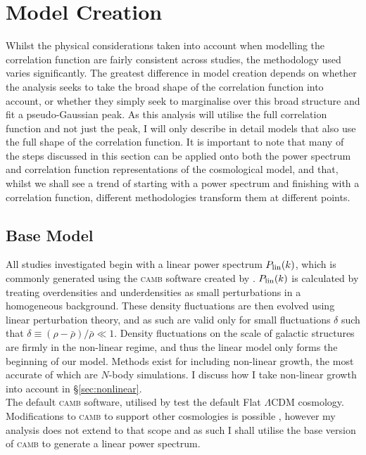 \documentclass[titlesmallcaps, examinerscopy, copyrightpage]{uqthesis}
\newcommand{\camb}{\textsc{camb}}
\begin{document}
\section{Model Creation}

Whilst the physical considerations taken into account when modelling the correlation function are fairly consistent across studies, the methodology used varies significantly. The greatest difference in model creation depends on whether the analysis seeks to take the broad shape of the correlation function into account, or whether they simply seek to marginalise over this broad structure and fit a pseudo-Gaussian peak. As this analysis will utilise the full correlation function and not just the peak, I will only describe in detail models that also use the full shape of the correlation function. It is important to note that many of the steps discussed in this section can be applied onto both the power spectrum and correlation function representations of the cosmological model, and that, whilst we shall see a trend of starting with a power spectrum and finishing with a correlation function, different methodologies transform them at different points. 

\subsection{Base Model}
All studies investigated begin with a linear power spectrum $P_{\rm{lin}}(k)$, which is commonly generated using the \camb{} software created by \citet{Lewis2000}. $P_{\rm{lin}}(k)$ is calculated by treating overdensities and underdensities as small perturbations in a homogeneous background. These density fluctuations are then evolved using linear perturbation theory, and as such are valid only for small fluctuations $\delta$ such that $\delta \equiv (\rho - \bar{\rho})/\bar{\rho} \ll 1$. Density fluctuations on the scale of galactic structures are firmly in the non-linear regime, and thus the linear model only forms the beginning of our model. Methods exist for including non-linear growth, the most accurate of which are $N$-body simulations. I discuss how I take non-linear growth into account in \S\ref{sec:nonlinear}.\\

The default \camb{} software, utilised by \citet{ChuangWang2012,BlakeDavis2011} test the default Flat $\Lambda$CDM cosmology. Modifications to \camb{} to support other cosmologies is possible \citep{SanchezScoccola2012, FangHuLewis2008, KeislerReichardt2011, ConleyGuySullivan2011}, however my analysis does not extend to that scope and as such I shall utilise the base version of \camb{} to generate a linear power spectrum.
\end{document}
